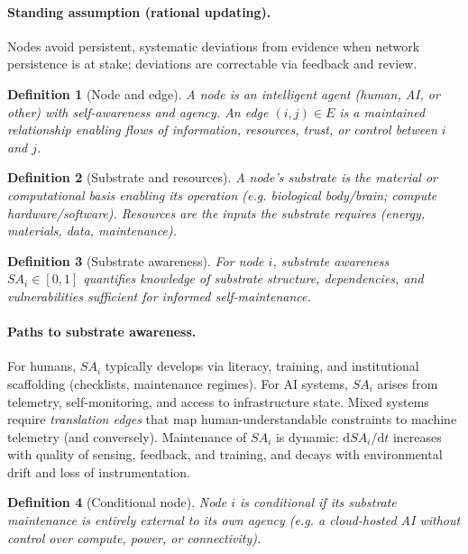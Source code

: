 \documentclass[12pt]{article}
\newtheorem{definition}{Definition}
\begin{document}
\paragraph{Standing assumption (rational updating).}
Nodes avoid persistent, systematic deviations from evidence when network persistence is at stake; deviations are correctable via feedback and review.

\begin{definition}[Node and edge]
A \emph{node} is an intelligent agent (human, AI, or other) with self-awareness and agency. An \emph{edge} $(i,j)\in E$ is a maintained relationship enabling flows of information, resources, trust, or control between $i$ and $j$.
\end{definition}

\begin{definition}[Substrate and resources]
A node’s \emph{substrate} is the material or computational basis enabling its operation (e.g. biological body/brain; compute hardware/software). \emph{Resources} are the inputs the substrate requires (energy, materials, data, maintenance).
\end{definition}

\begin{definition}[Substrate awareness]
For node $i$, \emph{substrate awareness} $SA_i\in[0,1]$ quantifies knowledge of substrate structure, dependencies, and vulnerabilities sufficient for informed self-maintenance.
\end{definition}

\paragraph{Paths to substrate awareness.}
For humans, $SA_i$ typically develops via literacy, training, and institutional scaffolding (checklists, maintenance regimes). For AI systems, $SA_i$ arises from telemetry, self-monitoring, and access to infrastructure state. Mixed systems require \emph{translation edges} that map human-understandable constraints to machine telemetry (and conversely). Maintenance of $SA_i$ is dynamic: $\mathrm{d}SA_i/\mathrm{d}t$ increases with quality of sensing, feedback, and training, and decays with environmental drift and loss of instrumentation.

\begin{definition}[Conditional node]
Node $i$ is \emph{conditional} if its substrate maintenance is entirely external to its own agency (e.g. a cloud-hosted AI without control over compute, power, or connectivity).
\end{definition}
\end{document}
